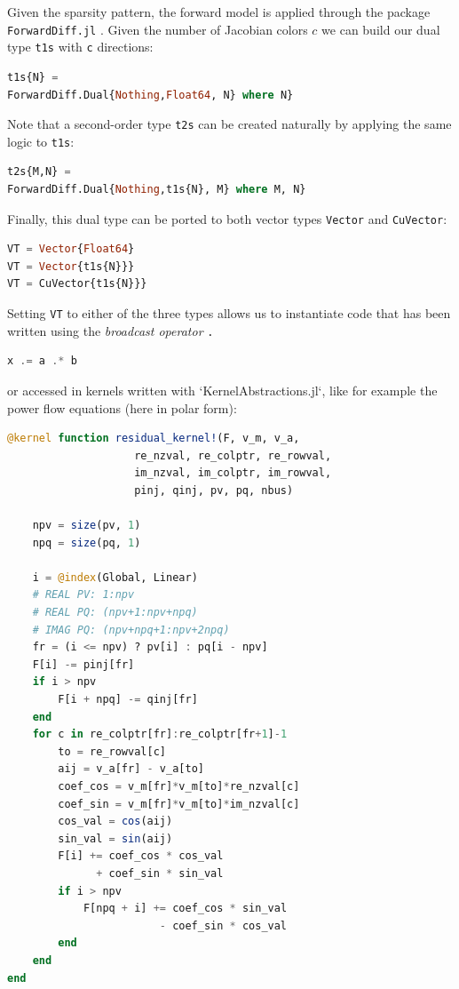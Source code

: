 \documentclass{juliacon}
\begin{document}
Given the sparsity pattern, the forward model is applied through the package
\lstinline{ForwardDiff.jl} \cite{RevelsLubinPapamarkou2016}. Given the number of Jacobian
colors $c$ we can build our dual type \lstinline{t1s} with \lstinline{c} directions:

\begin{lstlisting}[language = Julia]
t1s{N} = 
ForwardDiff.Dual{Nothing,Float64, N} where N}
\end{lstlisting}

Note that a second-order type \lstinline{t2s} can be created naturally by applying the same logic to \lstinline{t1s}:

\begin{lstlisting}[language = Julia]
t2s{M,N} =  
ForwardDiff.Dual{Nothing,t1s{N}, M} where M, N}
\end{lstlisting}

Finally, this dual type can be ported to both vector types \lstinline{Vector} and \lstinline{CuVector}:

\begin{lstlisting}[language = Julia]
VT = Vector{Float64}
VT = Vector{t1s{N}}}
VT = CuVector{t1s{N}}}
\end{lstlisting}

Setting \lstinline{VT} to either of the three types allows us to instantiate code that has been written using the {\it broadcast operator} \lstinline{.}

\begin{lstlisting}[language = Julia]
x .= a .* b
\end{lstlisting}

or accessed in kernels written with `KernelAbstractions.jl`, like for example the power flow equations (here in polar form):

\begin{lstlisting}[language = Julia]
@kernel function residual_kernel!(F, v_m, v_a,
                    re_nzval, re_colptr, re_rowval,
                    im_nzval, im_colptr, im_rowval,
                    pinj, qinj, pv, pq, nbus)

    npv = size(pv, 1)
    npq = size(pq, 1)

    i = @index(Global, Linear)
    # REAL PV: 1:npv
    # REAL PQ: (npv+1:npv+npq)
    # IMAG PQ: (npv+npq+1:npv+2npq)
    fr = (i <= npv) ? pv[i] : pq[i - npv]
    F[i] -= pinj[fr]
    if i > npv
        F[i + npq] -= qinj[fr]
    end
    for c in re_colptr[fr]:re_colptr[fr+1]-1
        to = re_rowval[c]
        aij = v_a[fr] - v_a[to]
        coef_cos = v_m[fr]*v_m[to]*re_nzval[c]
        coef_sin = v_m[fr]*v_m[to]*im_nzval[c]
        cos_val = cos(aij)
        sin_val = sin(aij)
        F[i] += coef_cos * cos_val 
              + coef_sin * sin_val
        if i > npv
            F[npq + i] += coef_cos * sin_val 
                        - coef_sin * cos_val
        end
    end
end
\end{lstlisting}
\end{document}
